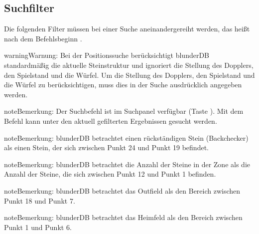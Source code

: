 \documentclass[letterpaper,10pt,german]{sphinxmanual}
\begin{document}
\subsection{Suchfilter}
\label{\detokenize{cmd_mode:filtres-de-recherche}}\label{\detokenize{cmd_mode:cmd-filter}}
\sphinxAtStartPar
Die folgenden Filter müssen bei einer Suche aneinandergereiht werden, das heißt nach dem Befehlsbeginn .

\label{\detokenize{cmd_mode:cmd-filter-pos}}
\begin{sphinxadmonition}{warning}{Warnung:}
\sphinxAtStartPar
Bei der Positionssuche berücksichtigt blunderDB standardmäßig die aktuelle Steinstruktur und ignoriert die Stellung des Dopplers, den Spielstand und die Würfel. Um die Stellung des Dopplers, den Spielstand und die Würfel zu berücksichtigen, muss dies in der Suche ausdrücklich angegeben werden.
\end{sphinxadmonition}

\begin{sphinxadmonition}{note}{Bemerkung:}
\sphinxAtStartPar
Der Suchbefehl  ist im Suchpanel verfügbar (Taste ). Mit dem Befehl  kann unter den aktuell gefilterten Ergebnissen gesucht werden.
\end{sphinxadmonition}

\begin{sphinxadmonition}{note}{Bemerkung:}
\sphinxAtStartPar
blunderDB betrachtet einen rückständigen Stein (Backchecker) als einen Stein, der sich zwischen Punkt 24 und Punkt 19 befindet.
\end{sphinxadmonition}

\begin{sphinxadmonition}{note}{Bemerkung:}
\sphinxAtStartPar
blunderDB betrachtet die Anzahl der Steine in der Zone als die Anzahl der Steine, die sich zwischen Punkt 12 und Punkt 1 befinden.
\end{sphinxadmonition}

\begin{sphinxadmonition}{note}{Bemerkung:}
\sphinxAtStartPar
blunderDB betrachtet das Outfield als den Bereich zwischen Punkt 18 und Punkt 7.
\end{sphinxadmonition}

\begin{sphinxadmonition}{note}{Bemerkung:}
\sphinxAtStartPar
blunderDB betrachtet das Heimfeld als den Bereich zwischen Punkt 1 und Punkt 6.
\end{sphinxadmonition}
\end{document}

